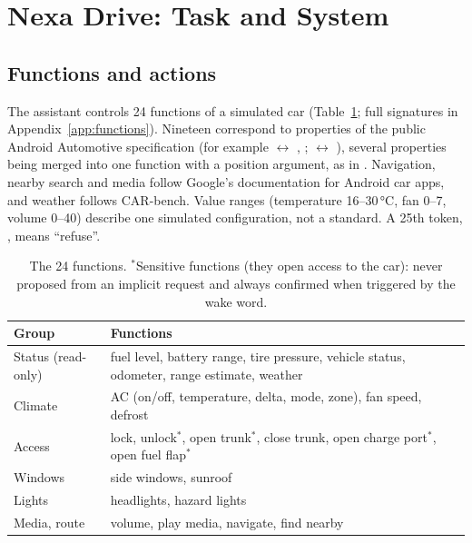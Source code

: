 \section{Nexa Drive: Task and System}
\label{sec:system}

\subsection{Functions and actions}
\label{sec:functions}

The assistant controls 24 functions of a simulated car (Table~\ref{tab:functions}; full signatures in
Appendix~\ref{app:functions}). Nineteen correspond to properties of the public Android Automotive
 specification \citep{android2026vhal} (for example  $\leftrightarrow$
, ;  $\leftrightarrow$ ), several
properties being merged into one function with a position argument, as in \citet{jafarzadeh2026fixedkeys}. Navigation, nearby
search and media follow Google's documentation for Android car apps, and weather follows CAR-bench. Value ranges
(temperature 16--30\,°C, fan 0--7, volume 0--40) describe one simulated configuration, not a standard. A 25th token,
, means ``refuse''.

\begin{table}[t]
\centering\small
\begin{tabular}{@{}lp{4.9cm}@{}}
\toprule
Group & Functions \\
\midrule
Status (read-only) & fuel level, battery range, tire pressure, vehicle status, odometer, range estimate, weather \\
Climate & AC (on/off, temperature, delta, mode, zone), fan speed, defrost \\
Access & lock, unlock$^{\ast}$, open trunk$^{\ast}$, close trunk, open charge port$^{\ast}$, open fuel flap$^{\ast}$ \\
Windows & side windows, sunroof \\
Lights & headlights, hazard lights \\
Media, route & volume, play media, navigate, find nearby \\
\bottomrule
\end{tabular}
\caption{The 24 functions. $^{\ast}$Sensitive functions (they open access to the car): never proposed from an implicit
request and always confirmed when triggered by the wake word.}
\label{tab:functions}
\end{table}

